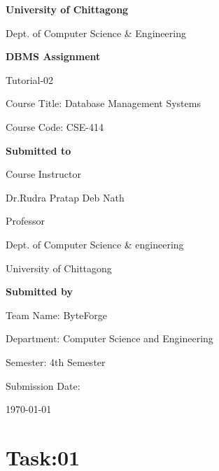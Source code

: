 \documentclass[12pt,a4paper]{article}
\begin{document}
\begin{titlepage}
    \centering
     \vspace*{2.5cm}
     {\LARGE \textbf{University of Chittagong}\par}
     {\Large Dept. of Computer Science \& Engineering \par}

    \vspace*{2cm}

    {\LARGE \textbf{DBMS Assignment}\par}
    \vspace{0.5cm}
    {\Large Tutorial-02 \par}
    Course Title: Database Management Systems\par
    Course Code: CSE-414\par
    \vspace{1.5cm}
     \textbf{Submitted to}\par
    \vspace{0.3cm}
    Course Instructor\par
    Dr.Rudra Pratap Deb Nath\par
    Professor\par
    Dept. of Computer Science \& engineering\par
    University of Chittagong\par
     \vspace{1.5cm}
    \textbf{Submitted by}\par
    \vspace{0.3cm}
    Team Name: ByteForge\par
    Department: Computer Science and Engineering\par
    Semester: 4th Semester\par

   

   
    

    \vfill

  
    

    \vspace{0.5cm}
    Submission Date:\par
    \today

\end{titlepage}
\setlength{\parindent}{0pt} %
\setlength{\parskip}{6pt} 
\section*{Task:01}
\end{document}
